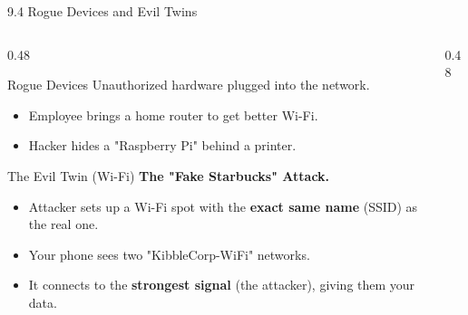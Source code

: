 \documentclass[aspectratio=169]{beamer}  %
\begin{document}
\begin{frame}{9.4 Rogue Devices and Evil Twins}
    \begin{columns}[T]
        \begin{column}{0.48\textwidth}
            \begin{block}{Rogue Devices}
                \footnotesize
                Unauthorized hardware plugged into the network.
                \begin{itemize}
                    \item Employee brings a home router to get better Wi-Fi.
                    \item Hacker hides a "Raspberry Pi" behind a printer.
                \end{itemize}
            \end{block}
            \begin{alertblock}{The Evil Twin (Wi-Fi)}
                \footnotesize
                \textbf{The "Fake Starbucks" Attack.}
                \begin{itemize}
                    \item Attacker sets up a Wi-Fi spot with the \textbf{exact same name} (SSID) as the real one.
                    \item Your phone sees two "KibbleCorp-WiFi" networks.
                    \item It connects to the \textbf{strongest signal} (the attacker), giving them your data.
                \end{itemize}
            \end{alertblock}
        \end{column}
        \begin{column}{0.48\textwidth}
            \begin{center}
\end{center}
\end{column}
\end{columns}
\end{frame}
\end{document}
